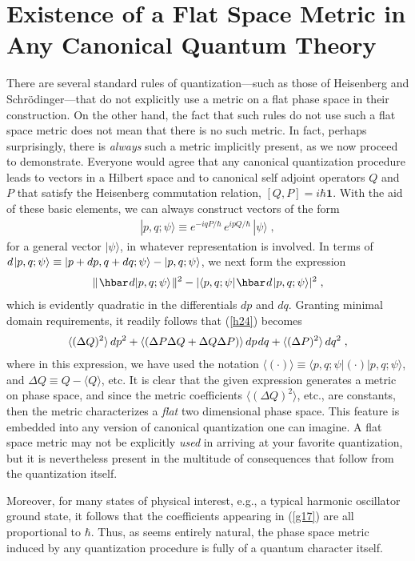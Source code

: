 \documentclass[12pt]{article}
\def\one{\mathbf 1}
\def\De{\Delta}
\def\s{\hskip.08em}
\def\bn{\begin{eqnarray}}     %
\def\en{\end{eqnarray}}       %
\def\<{\langle}
\def\>{\rangle}
\begin{document}
\section{Existence of a Flat Space Metric in Any Canonical Quantum Theory}
There are several standard rules of quantization---such as those of 
Heisenberg and Schr\"odinger---that do not explicitly use a metric on a 
flat phase space in their construction. On the other hand, the fact that 
such rules do not use such a flat space metric does not mean that there 
is no such metric. In fact, perhaps surprisingly, there is {\it always} 
such a metric implicitly present, as we now proceed to demonstrate. Everyone 
would agree that any canonical quantization procedure leads to vectors in a 
Hilbert space and to canonical self adjoint operators $Q$ and $P$ that 
satisfy the Heisenberg commutation relation, $[Q,P]=i\hbar\one$. With the 
aid of these basic elements, we can always construct vectors of the form
  \bn  |p,q;\psi\>\equiv e^{-iqP/\hbar}\,e^{ipQ/\hbar}\,|\psi\>\;,  \en
for a general vector $|\psi\>$, in whatever representation is involved. In 
terms of $d\s|p,q;\psi\>\equiv|p+dp,q+dq;\psi\>-|p,q;\psi\>$, we next form 
the expression
  \bn  \|\s\hbar\s d|p,q;\psi\>\s\|^2-
|\<p,q;\psi|\s\hbar\s d\s |p,q;\psi\>|^2 \;, \label{h24}\en
which is evidently quadratic in the differentials $dp$ and $dq$. 
Granting minimal domain requirements, it readily follows that (\ref{h24}) 
becomes
 \bn  \<(\De Q)^2\>\, dp^2+\<(\De P\De Q+\De Q\De P)\>\, dp\s dq+
\<(\De P)^2\>\,dq^2\;,  \label{g17}\en
where in this expression, we have used the notation 
  $\<(\cdot)\>\equiv\<p,q;\psi|(\cdot)|p,q;\psi\>$, and 
$\De Q\equiv Q-\<Q\>$, etc. It is clear that the given expression 
generates a metric on phase space, and since the metric coefficients 
$\<(\De Q)^2\>$, etc.,  are constants, then the metric characterizes a 
{\it flat} two dimensional phase space. This feature is embedded into 
any version of canonical quantization one can imagine. A flat space 
metric may not be explicitly {\it used} in arriving at your favorite 
quantization, but it is nevertheless present in the multitude of 
consequences that follow from the quantization itself. 

Moreover, for many states of physical interest, e.g., a typical harmonic 
oscillator ground state, it follows that the coefficients appearing in 
(\ref{g17}) are all proportional to $\hbar$. Thus, as seems entirely 
natural, the phase space metric induced by any quantization procedure is 
fully of a quantum character itself.
\end{document}
